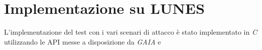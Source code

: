 \chapter{Implementazione su LUNES}

L'implementazione del test con i vari scenari di attacco è stato implementato in \textit{C} utilizzando le API messe a disposizione da \textit{GAIA} e 
